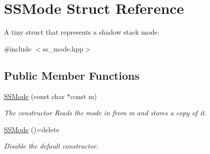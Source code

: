 \hypertarget{struct_s_s_mode}{\section{S\-S\-Mode Struct Reference}
\label{struct_s_s_mode}
}


A tiny struct that represents a shadow stack mode.  




{\ttfamily \#include $<$ss\-\_\-mode.\-hpp$>$}

\subsection*{Public Member Functions}
\begin{DoxyCompactItemize}
\item 
\hyperlink{struct_s_s_mode_acf06136523caccfa31298e20db0980ce}{S\-S\-Mode} (const char $\ast$const m)
\begin{DoxyCompactList}\small\item\em The constructor Reads the mode in from m and stores a copy of it. \end{DoxyCompactList}\item 
\hyperlink{struct_s_s_mode_ab0b59c6a937b185e602dc4b252c0f036}{S\-S\-Mode} ()=delete
\begin{DoxyCompactList}\small\item\em Disable the default constructor. \end{DoxyCompactList}\end{DoxyCompactItemize}
